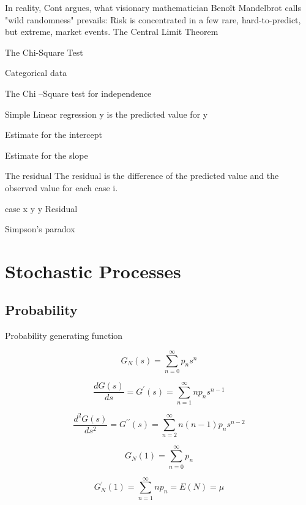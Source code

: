 In reality, Cont argues, what visionary mathematician Benoît Mandelbrot calls "wild randomness" prevails: Risk is concentrated in a few rare, hard-to-predict, but extreme, market events.
The Central Limit Theorem




The Chi-Square Test
 
Categorical data
 
The Chi –Square test for independence
 
Simple Linear regression
y is the predicted value for y 


Estimate for the intercept

Estimate for the slope

The residual
The residual is the difference of the predicted value and the observed value for each case i.

case
x
y
y
Residual



Simpson's paradox




\chapter{Stochastic Processes}

\section{Probability}

Probability generating function

\begin{equation}
G_N(s) = \sum_{n=0}^{\infty} p_{n}s^{n}
\end{equation}

\begin{equation}
\frac{dG(s)}{ds} = G^{\prime}(s) = \sum_{n=1}^{\infty}
np_{n}s^{n-1}
\end{equation}


\begin{equation}
\frac{d^2G(s)}{ds^2} = G^{\prime \prime}(s) =
\sum_{n=2}^{\infty}n(n-1)p_{n}s^{n-2}
\end{equation}

\begin{equation}
G_N(1) = \sum_{n=0}^{\infty} p_{n}
\end{equation}

\begin{equation}
G^{\prime}_N(1) = \sum_{n=1}^{\infty} np_{n}=E(N) = \mu
\end{equation}


